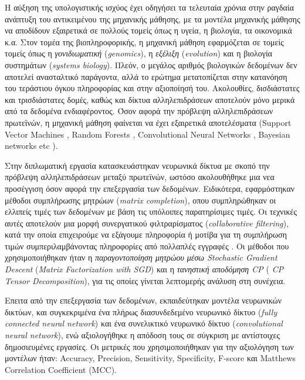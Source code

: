\medskip
Η αύξηση της υπολογιστικής ισχύος έχει οδηγήσει τα τελευταία χρόνια στην ραγδαία ανάπτυξη του αντικειμένου της μηχανικής μάθησης, με τα μοντέλα μηχανικής μάθησης να αποδίδουν εξαιρετικά σε πολλούς τομείς όπως η υγεία, η βιολογία, τα οικονομικά κ.α. Στον τομέα της βιοπληροφορικής, η μηχανική μάθηση εφαρμόζεται σε τομείς τομείς όπως η \textit{γονιδιωματική} (\textit{genomics}), η \textit{εξέλιξη} (\textit{evolution}) και η βιολογία συστημάτων (\textit{systems biology}). Πλεόν, ο μεγάλος αριθμός βιολογικών δεδομένων δεν αποτελεί ανασταλτικό παράγοντα, αλλά το ερώτημα μετατοπίζεται στην κατανόηση του τεράστιου όγκου πληροφορίας και στην αξιοποίησή του. Ακολουθίες, δισδιάστατες και τρισδιάστατες δομές, καθώς και δίκτυα αλληλεπιδράσεων αποτελούν μόνο μερικά από τα δεδομένα ενδιαφέροντος. Όσον αφορά την πρόβλεψη αλληλεπιδράσεων πρωτεϊνών, η μηχανική μάθηση φαίνεται να έχει εξαιρετικά αποτελέσματα (Support Vector Machines \cite{Bradford2005}, Random Forests \cite{Mengying2017}, Convolutional Neural Networks \cite{Xie2020}, Bayesian networks \cite{NEUVIRTH2004} etc ).

\medskip
Στην διπλωματική εργασία κατασκευάστηκαν νευρωνικά δίκτυα με σκοπό την πρόβλεψη αλληλεπιδράσεων μεταξύ πρωτεϊνών, ωστόσο ακολουθήθηκε μια νεα προσέγγιση όσον αφορά την επεξεργασία των δεδομένων. Ειδικότερα, εφαρμόστηκαν μέθοδοι συμπλήρωσης μητρώων (\textit{matrix completion}), οπου συμπληρώθηκαν οι ελλιπείς τιμές των δεδομένων με βάση τις υπόλοιπες παρατηρίσιμες τιμές. Οι τεχνικές αυτές αποτελούν μια μορφή συνεργατικού φιλτραρίσματος (\textit{collaborative filtering}), κατά την οποία επιχειρούμε να εξάγουμε πληροφορία ή μοτίβα για τη συμπλήρωση τιμών συμπεριλαμβάνοντας πληροφορίες από πολλαπλές εγγραφές \cite{Terveen2001}. Οι μέθοδοι που χρησιμοποιήθηκαν ήταν η \textit{παραγοντοποίηση μητρώου μέσω Stochastic Gradient Descent} (\textit{Matrix Factorization with SGD}) και η \textit{τανηστική αποδόμηση CP} ( \textit{CP Tensor Decomposition}), για τις οποίες γίνεται λεπτομερής ανάλυση στη συνέχεια.

\medskip
Επειτα από την επεξεργασία των δεδομένων, εκπαιδεύτηκαν μοντέλα νευρωνικών δικτύων, και συγκεκριμένα ένα πλήρως διασυνδεδεμένο νευρωνικό δίκτυο (\textit{fully connected neural network}) και ένα συνελικτικό νευρωνικό δίκτυο (\textit{convolutional neural network}), ενώ αξιολογήθηκε η απόδοση τους σε σύγκριση με αντίστοιχες δημοσιευμένες εργασίες. Οι μετρικές που χρησιμοποιήθηκαν για την αξιολόγηση των μοντέλων ήταν: Accuracy, Precision, Sensitivity, Specificity, F-score και Matthews Correlation Co\-efficient (MCC). 



